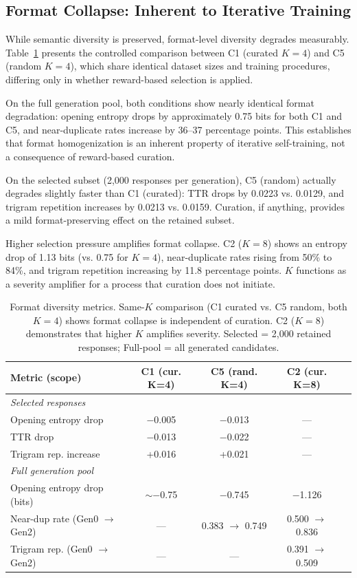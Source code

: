 \documentclass[11pt,a4paper]{article}
\begin{document}
\subsection{Format Collapse: Inherent to Iterative Training}
\label{sec:format}

While semantic diversity is preserved, format-level diversity degrades measurably. Table~\ref{tab:format} presents the controlled comparison between C1 (curated $K{=}4$) and C5 (random $K{=}4$), which share identical dataset sizes and training procedures, differing only in whether reward-based selection is applied.

On the full generation pool, both conditions show nearly identical format degradation: opening entropy drops by approximately 0.75 bits for both C1 and C5, and near-duplicate rates increase by 36--37 percentage points. This establishes that format homogenization is an inherent property of iterative self-training, not a consequence of reward-based curation.

On the selected subset (2,000 responses per generation), C5 (random) actually degrades slightly faster than C1 (curated): TTR drops by 0.0223 vs. 0.0129, and trigram repetition increases by 0.0213 vs. 0.0159. Curation, if anything, provides a mild format-preserving effect on the retained subset.

Higher selection pressure amplifies format collapse. C2 ($K{=}8$) shows an entropy drop of 1.13 bits (vs. 0.75 for $K{=}4$), near-duplicate rates rising from 50\% to 84\%, and trigram repetition increasing by 11.8 percentage points. $K$ functions as a severity amplifier for a process that curation does not initiate.

\begin{table}[t]
\centering
\caption{Format diversity metrics. Same-$K$ comparison (C1 curated vs. C5 random, both $K{=}4$) shows format collapse is independent of curation. C2 ($K{=}8$) demonstrates that higher $K$ amplifies severity. Selected = 2,000 retained responses; Full-pool = all generated candidates.}
\label{tab:format}
\small
\begin{tabular}{@{}lcccc@{}}
\toprule
Metric (scope) & C1 (cur. K=4) & C5 (rand. K=4) & C2 (cur. K=8) \\
\midrule
\multicolumn{4}{l}{\textit{Selected responses}} \\
Opening entropy drop & $-$0.005 & $-$0.013 & --- \\
TTR drop & $-$0.013 & $-$0.022 & --- \\
Trigram rep. increase & +0.016 & +0.021 & --- \\
\midrule
\multicolumn{4}{l}{\textit{Full generation pool}} \\
Opening entropy drop (bits) & $\sim$$-$0.75 & $-$0.745 & $-$1.126 \\
Near-dup rate (Gen0 $\to$ Gen2) & --- & 0.383 $\to$ 0.749 & 0.500 $\to$ 0.836 \\
Trigram rep. (Gen0 $\to$ Gen2) & --- & --- & 0.391 $\to$ 0.509 \\
\bottomrule
\end{tabular}
\end{table}
\end{document}
